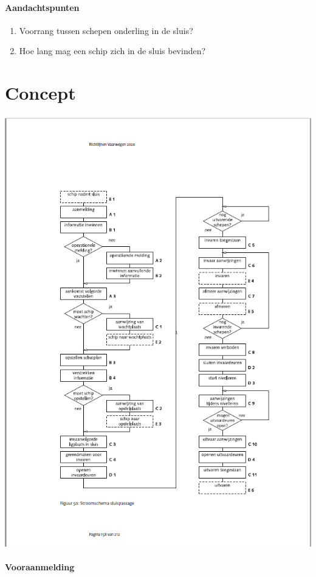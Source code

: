 \paragraph{Aandachtspunten}
\begin{enumerate}
	\item Voorrang tussen schepen onderling in de sluis?
	\item Hoe lang mag een schip zich in de sluis bevinden?
\end{enumerate} 

\section{Concept}

\includegraphics[scale=0.65]{sluispassage.png}

\paragraph{Vooraanmelding}


